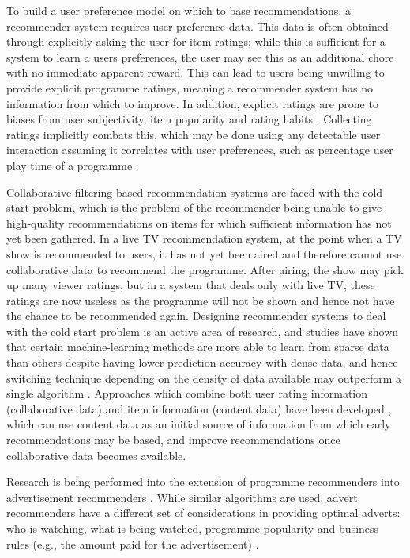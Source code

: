 	To build a user preference model on which to base recommendations, a recommender system requires user preference data. This data is often obtained through explicitly asking the user for item ratings; while this is sufficient for a system to learn a users preferences, the user may see this as an additional chore with no immediate apparent reward. This can lead to users being unwilling to provide explicit programme ratings, meaning a recommender system has no information from which to improve. In addition, explicit ratings are prone to biases from user subjectivity, item popularity and rating habits \citep[p.~304]{recommender-systems-handbook}. Collecting ratings implicitly combats this, which may be done using any detectable user interaction assuming it correlates with user preferences, such as percentage user play time of a programme \citep[p.~305]{recommender-systems-handbook}.

	Collaborative-filtering based recommendation systems are faced with the cold start problem, which is the problem of the recommender being unable to give high-quality recommendations on items for which sufficient information has not yet been gathered. In a live TV recommendation system, at the point when a TV show is recommended to users, it has not yet been aired and therefore cannot use collaborative data to recommend the programme. After airing, the show may pick up many viewer ratings, but in a system that deals only with live TV, these ratings are now useless as the programme will not be shown and hence not have the chance to be recommended again. Designing recommender systems to deal with the cold start problem is an active area of research, and studies have shown that certain machine-learning methods are more able to learn from sparse data than others despite having lower prediction accuracy with dense data, and hence switching technique depending on the density of data available may outperform a single algorithm \citep{cold-start-problem}. Approaches which combine both user rating information (collaborative data) and item information (content data) have been developed \citep{generative_models}, which can use content data as an initial source of information from which early recommendations may be based, and improve recommendations once collaborative data becomes available.

	Research is being performed into the extension of programme recommenders into advertisement recommenders \citep{contextual_advertising}. While similar algorithms are used, advert recommenders have a different set of considerations in providing optimal adverts: who is watching, what is being watched, programme popularity and business rules (e.g., the amount paid for the advertisement) \citep{contextual_advertising}.


